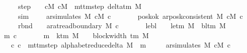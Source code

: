 \begin{isabellebody}
\ \ \ \ \ \ \ step{\isacharcolon}{\kern0pt}\ \ \ \ {\isachardoublequoteopen}{\isacharparenleft}{\kern0pt}cM{\isacharcomma}{\kern0pt}\ cM{\isacharunderscore}{\kern0pt}{}{\isacharparenright}{\kern0pt}\ {\isasymin}\ mttm{\isacharunderscore}{\kern0pt}step\ {\isacharparenleft}{\kern0pt}delta{\isacharunderscore}{\kern0pt}tm\ M{\isacharparenright}{\kern0pt}{\isachardoublequoteclose}\isanewline
\ \ \ \ \ \ \ sim{\isacharcolon}{\kern0pt}\ \ \ \ \ {\isachardoublequoteopen}ar{\isacharunderscore}{\kern0pt}simulates\ M\ cM\ c{\isacharprime}{\kern0pt}{\isachardoublequoteclose}\isanewline
\ \ \ \ \ \ \ posk{\isacharunderscore}{\kern0pt}ok{\isacharcolon}{\kern0pt}\ {\isachardoublequoteopen}ar{\isacharunderscore}{\kern0pt}posk{\isacharunderscore}{\kern0pt}consistent\ M\ cM\ c{\isacharprime}{\kern0pt}{\isachardoublequoteclose}\isanewline
\ \ \ \ \ \ \ rbnd{\isacharcolon}{\kern0pt}\ \ \ \ {\isachardoublequoteopen}ar{\isacharunderscore}{\kern0pt}at{\isacharunderscore}{\kern0pt}read{\isacharunderscore}{\kern0pt}boundary\ M\ c{\isacharprime}{\kern0pt}{\isachardoublequoteclose}\isanewline
\ \ \ \ \ \ \ lebl{\isacharcolon}{\kern0pt}\ \ \ \ {\isachardoublequoteopen}le{\isacharunderscore}{\kern0pt}tm\ M\ {\isasymnoteq}\ bl{\isacharunderscore}{\kern0pt}tm\ M{\isachardoublequoteclose}\isanewline
\ \ \ m\ c{\isacharprime}{\kern0pt}{\isacharprime}{\kern0pt}\ \isanewline
\ \ \ \ \ \ {\isachardoublequoteopen}m\ {\isasymle}\ k{\isacharunderscore}{\kern0pt}tm\ M\ {\isacharasterisk}{\kern0pt}\ {\isacharparenleft}{\kern0pt}{}\ {\isacharasterisk}{\kern0pt}\ block{\isacharunderscore}{\kern0pt}width\ {\isacharparenleft}{\kern0pt}{\isasymGamma}{\isacharunderscore}{\kern0pt}tm\ M{\isacharparenright}{\kern0pt}\ {\isacharplus}{\kern0pt}\ {}{\isacharparenright}{\kern0pt}\ {\isacharplus}{\kern0pt}\ {}{\isachardoublequoteclose}\isanewline
\ \ \ \ \ {\isachardoublequoteopen}{\isacharparenleft}{\kern0pt}c{\isacharprime}{\kern0pt}{\isacharcomma}{\kern0pt}\ c{\isacharprime}{\kern0pt}{\isacharprime}{\kern0pt}{\isacharparenright}{\kern0pt}\ {\isasymin}\ mttm{\isacharunderscore}{\kern0pt}step\ {\isacharparenleft}{\kern0pt}alphabet{\isacharunderscore}{\kern0pt}reduce{\isacharunderscore}{\kern0pt}delta\ M{\isacharparenright}{\kern0pt}\ {\isacharcircum}{\kern0pt}{\isacharcircum}{\kern0pt}\ m{\isachardoublequoteclose}\isanewline
\ \ \ \ \ {\isachardoublequoteopen}ar{\isacharunderscore}{\kern0pt}simulates\ M\ cM{\isacharunderscore}{\kern0pt}{}\ c{\isacharprime}{\kern0pt}{\isacharprime}{\kern0pt}{\isachardoublequoteclose}\isanewline

\end{isabellebody}
